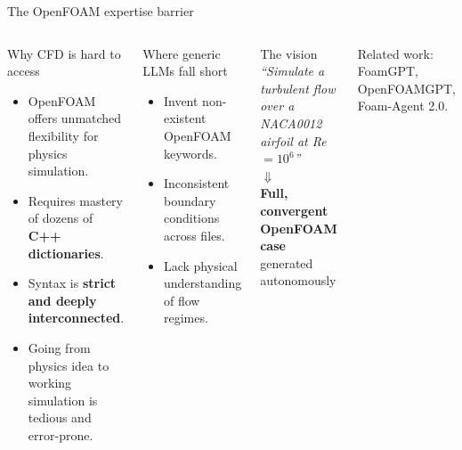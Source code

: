 \documentclass[aspectratio=169,10pt]{beamer}
\newcommand{\smallnote}[1]{{\scriptsize\color{midgray}#1}}
\begin{document}
\begin{frame}{The OpenFOAM expertise barrier}
\begin{columns}[T,onlytextwidth]
\begin{block}{Why CFD is hard to access}
\begin{itemize}\small
  \item OpenFOAM offers unmatched flexibility for physics simulation.
  \item Requires mastery of dozens of \textbf{C++ dictionaries}.
  \item Syntax is \textbf{strict and deeply interconnected}.
  \item Going from physics idea to working simulation is tedious and error-prone.
\end{itemize}
\end{block}
\begin{alertblock}{Where generic LLMs fall short}
\begin{itemize}\small
  \item Invent non-existent OpenFOAM keywords.
  \item Inconsistent boundary conditions across files.
  \item Lack physical understanding of flow regimes.
\end{itemize}
\end{alertblock}

\begin{exampleblock}{The vision}
\centering\vspace{3pt}
\small\textit{``Simulate a turbulent flow over a NACA0012 airfoil at Re$=10^6$''}\\[5pt]
$\Downarrow$\\[3pt]
\textbf{Full, convergent OpenFOAM case}\\generated autonomously
\vspace{3pt}
\end{exampleblock}
\smallnote{Related work: FoamGPT, OpenFOAMGPT, Foam-Agent 2.0.}
\end{columns}
\end{frame}
\end{document}
